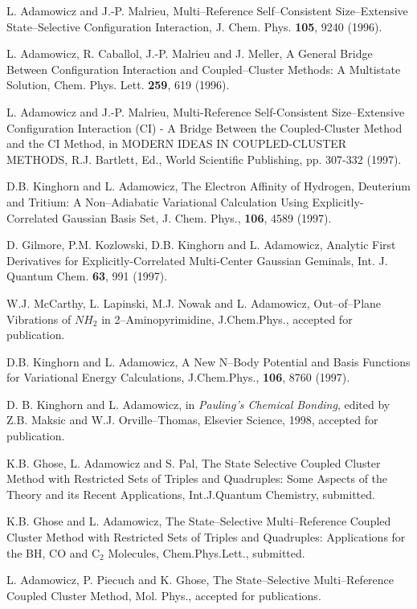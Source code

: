 \begin{thebibliography}{999}
L. Adamowicz and J.-P. Malrieu, Multi--Reference 
Self--Consistent Size--Extensive State--Selective
Configuration Interaction, J. Chem. Phys. 
{\bf 105}, 9240 (1996).

L. Adamowicz, R. Caballol, J.-P. Malrieu and J. Meller, 
A General Bridge Between Configuration
Interaction and Coupled--Cluster Methods:  A Multistate 
Solution, Chem. Phys. Lett.
{\bf 259}, 619 (1996).

L. Adamowicz and J.-P. Malrieu, Multi-Reference Self-Consistent 
Size--Extensive Configuration
Interaction (CI) - A Bridge Between the Coupled-Cluster 
Method and the CI Method, in MODERN
IDEAS IN COUPLED-CLUSTER METHODS, R.J. Bartlett, 
Ed., World Scientific Publishing, pp. 307-332 (1997).

D.B. Kinghorn and L. Adamowicz, 
The Electron Affinity of Hydrogen, Deuterium and Tritium:  
A Non--Adiabatic Variational Calculation Using Explicitly-Correlated 
Gaussian Basis Set, J. Chem. Phys.,
{\bf 106}, 4589 (1997).

D. Gilmore, P.M. Kozlowski, D.B. Kinghorn and 
L. Adamowicz, Analytic First Derivatives for
Explicitly-Correlated Multi-Center Gaussian Geminals, 
Int. J. Quantum Chem. {\bf 63}, 991 (1997).

W.J. McCarthy, L. Lapinski, M.J. Nowak and L. Adamowicz,
Out--of--Plane Vibrations of $NH_2$ in 2--Aminopyrimidine, 
J.Chem.Phys., accepted for publication.  

D.B. Kinghorn and L. Adamowicz,
A New N--Body Potential and Basis Functions for
Variational Energy Calculations,
J.Chem.Phys., {\bf 106}, 8760 (1997).

D. B. Kinghorn and L. Adamowicz, in {\em Pauling's Chemical
Bonding}, edited by Z.B. Maksic and W.J. Orville--Thomas,
Elsevier Science, 1998, accepted for publication.

K.B. Ghose, L. Adamowicz and S. Pal,
The State Selective Coupled Cluster Method with
Restricted Sets of Triples and Quadruples:
Some Aspects of the Theory and its Recent Applications,
Int.J.Quantum Chemistry, submitted.

K.B. Ghose and L. Adamowicz,
The State--Selective Multi--Reference Coupled Cluster
Method with Restricted Sets of Triples and Quadruples:
Applications for the BH, CO and C$_2$ Molecules,
Chem.Phys.Lett., submitted.


L. Adamowicz, P. Piecuch and K. Ghose, 
The State--Selective Multi--Reference
Coupled Cluster Method, Mol. Phys., 
accepted for publications.




\end{thebibliography}
